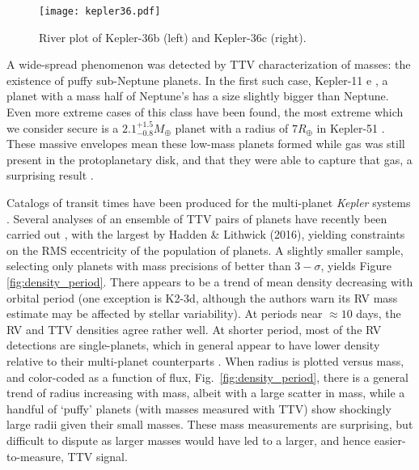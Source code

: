 \documentclass[graybox,natbib,nosecnum]{svmult}
\begin{document}
\begin{figure}
\centerline{
\texttt{[image: kepler36.pdf]}}
\caption{River plot of Kepler-36b (left) and Kepler-36c (right).}
\label{fig:kep36}
\end{figure}

A wide-spread phenomenon was detected by TTV characterization of masses: the existence of puffy sub-Neptune planets.  In the first such case, Kepler-11 e \citep{2011Natur.470...53L}, a planet with a mass half of Neptune's has a size slightly bigger than Neptune.  Even more extreme cases of this class have been found, the most extreme which we consider secure is a $2.1^{+1.5}_{-0.8} M_\oplus$ planet with a radius of $7 R_\oplus$ in Kepler-51 \citep{2014ApJ...783...53M}.  These massive envelopes mean these low-mass planets formed while gas was still present in the protoplanetary disk, and that they were able to capture that gas, a surprising result \citep[e.g.][]{2016ApJ...817...90L,2016ApJ...825...29G}. 

Catalogs of transit times have been produced for the multi-planet \emph{Kepler} systems \citep{2013ApJS..208...16M,Rowe2015,2016ApJS..225....9H}. Several analyses of an ensemble of TTV pairs of planets have recently been carried out \citep{2014ApJ...787...80H,2013ApJS..208...22X,2014ApJS..210...25X,2016ApJ...820...39J}, with the largest by Hadden \& Lithwick (2016), yielding constraints on the RMS eccentricity of the population of planets.  A slightly smaller sample, selecting only planets with mass precisions of better than $3-\sigma$, yields Figure \ref{fig:density_period}.  There appears to be a trend of mean density decreasing with orbital period (one exception is K2-3d, although the authors warn its RV mass estimate may be affected by stellar variability).  At periods near $\approx 10$ days, the RV and TTV densities agree rather well.  At shorter period, most of the RV detections are single-planets, which in general appear to have lower density relative to their multi-planet counterparts \citep{Steffen2016}.  When radius is plotted versus mass, and color-coded as a function of flux, Fig.\ \ref{fig:density_period}, there is a general trend of radius increasing with mass, albeit with a large scatter in mass, while a handful of `puffy' planets (with masses measured with TTV) show shockingly large radii given their small masses.  These mass measurements are surprising, but difficult to dispute as larger masses would have led to a larger, and hence easier-to-measure, TTV signal.
\end{document}
